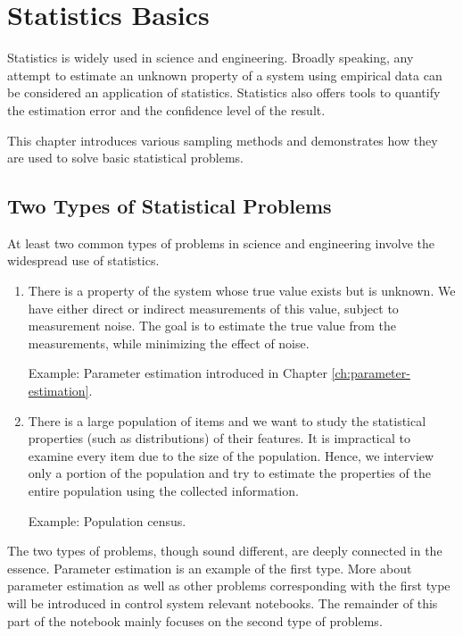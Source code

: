 \chapter{Statistics Basics} \label{ch:statisticsandsampling}

Statistics is widely used in science and engineering. Broadly speaking, any attempt to estimate an unknown property of a system using empirical data can be considered an application of statistics. Statistics also offers tools to quantify the estimation error and the confidence level of the result.

This chapter introduces various sampling methods and demonstrates how they are used to solve basic statistical problems.

\section{Two Types of Statistical Problems}

At least two common types of problems in science and engineering involve the widespread use of statistics.

\begin{enumerate}
	\item There is a property of the system whose true value exists but is unknown. We have either direct or indirect measurements of this value, subject to measurement noise. The goal is to estimate the true value from the measurements, while minimizing the effect of noise.

	Example: Parameter estimation introduced in Chapter \ref{ch:parameter-estimation}.

	\item There is a large population of items and we want to study the statistical properties (such as distributions) of their features. It is impractical to examine every item due to the size of the population. Hence, we interview only a portion of the population and try to estimate the properties of the entire population using the collected information.
	
	Example: Population census.

\end{enumerate}

The two types of problems, though sound different, are deeply connected in the essence. Parameter estimation is an example of the first type. More about parameter estimation as well as other problems corresponding with the first type will be introduced in control system relevant notebooks. The remainder of this part of the notebook mainly focuses on the second type of problems.

